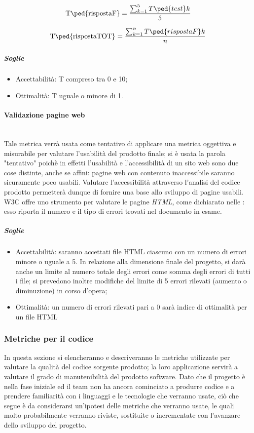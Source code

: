 	\begin{displaymath}
		\mbox{T\ped{rispostaF}} =\frac{\sum_{k=1}^5 T\ped{test}k}{5}
	\end{displaymath}
	
	\begin{displaymath}
		\mbox{T\ped{rispostaTOT}} =\frac{\sum_{k=1}^n T\ped{rispostaF}k}{n}
	\end{displaymath}
	
	\subparagraph{Soglie}
	\begin{itemize}
	\item Accettabilità: T compreso tra 0 e 10;
	\item Ottimalità: T uguale o minore di 1.
	\end{itemize}
	 
\paragraph{Validazione pagine web}
\label{AppB:Usabilita}
	~\\Tale metrica verrà usata come tentativo di applicare una metrica oggettiva e misurabile per valutare l'usabilità del prodotto finale; si è usata la parola "tentativo" poichè in effetti l'usabilità e l'accessibilità di un sito web sono due cose distinte, anche se affini: pagine web con contenuto inaccessibile saranno sicuramente poco usabili. Valutare l'accessibilità attraverso l'analisi del codice prodotto permetterà dunque di fornire una base allo sviluppo di pagine usabili.
W3C offre uno strumento per valutare le pagine \emph{HTML}, come dichiarato nelle \NdP{}: esso riporta il numero e il tipo di errori trovati nel documento in esame.

\subparagraph{Soglie}
	\begin{itemize}
	\item Accettabilità: saranno accettati file HTML ciascuno con un numero di errori minore o uguale a 5. In relazione alla dimensione finale del progetto, si darà anche un limite al numero totale degli errori come somma degli errori di tutti i file; si prevedono inoltre modifiche del limite di 5 errori rilevati (aumento o diminuzione) in corso d'opera;
	\item Ottimalità: un numero di errori rilevati pari a 0 sarà indice di ottimalità per un file HTML
	\end{itemize}
	
\pagebreak
\subsubsection{Metriche per il codice}
\label{AppB:metricheCod}
In questa sezione si elencheranno e descriveranno le metriche utilizzate per valutare la qualità del codice sorgente prodotto; la loro applicazione servirà a valutare il grado di manutenibilità del prodotto software. Dato che il progetto è nella fase iniziale ed il team non ha ancora cominciato a produrre codice e a prendere familiarità con i linguaggi e le tecnologie che verranno usate, ciò che segue è da considerarsi un'ipotesi delle metriche che verranno usate, le quali molto probabilmente verranno riviste, sostituite o incrementate con l'avanzare dello sviluppo del progetto.

